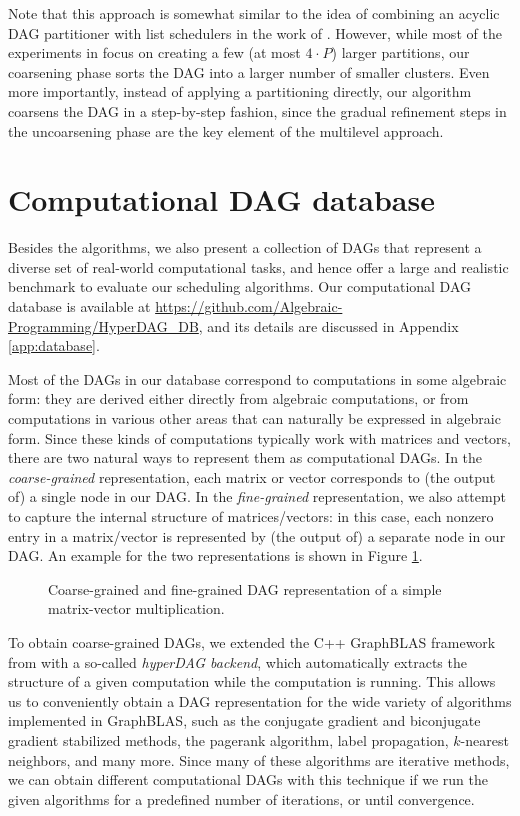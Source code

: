 \documentclass[sigconf,nonacm]{acmart}
\begin{document}
Note that this approach is somewhat similar to the idea of combining an acyclic DAG partitioner with list schedulers in the work of \cite{SPD}. However, while most of the experiments in \cite{SPD} focus on creating a few (at most $4 _{\!} \cdot _{\!} P$) larger partitions, our coarsening phase sorts the DAG into a larger number of smaller clusters. Even more importantly, instead of applying a partitioning directly, our algorithm coarsens the DAG in a step-by-step fashion, since the gradual refinement steps in the uncoarsening phase are the key element of the multilevel approach.

\section{Computational DAG database}

Besides the algorithms, we also present a collection of DAGs that represent a diverse set of real-world computational tasks, and hence offer a large and realistic benchmark to evaluate our scheduling algorithms. Our computational DAG database is available at \url{https://github.com/Algebraic-Programming/HyperDAG_DB}, and its details are discussed in Appendix \ref{app:database}.

Most of the DAGs in our database correspond to computations in some algebraic form: they are derived either directly from algebraic computations, or from computations in various other areas that can naturally be expressed in algebraic form. Since these kinds of computations typically work with matrices and vectors, there are two natural ways to represent them as computational DAGs. In the \emph{coarse-grained} representation, each matrix or vector corresponds to (the output of) a single node in our DAG. In the \emph{fine-grained} representation, we also attempt to capture the internal structure of matrices/vectors: in this case, each nonzero entry in a matrix/vector is represented by (the output of) a separate node in our DAG. An example for the two representations is shown in Figure \ref{fig:coarse_fine}.

\begin{figure}
    \centering
    
    \caption{Coarse-grained and fine-grained DAG representation of a simple matrix-vector multiplication.}
    \label{fig:coarse_fine}
\end{figure}

To obtain coarse-grained DAGs, we extended the C++ GraphBLAS framework from \cite{alp1} with a so-called \textit{hyperDAG backend}, which automatically extracts the structure of a given computation while the computation is running. This allows us to conveniently obtain a DAG representation for the wide variety of algorithms implemented in GraphBLAS, such as the conjugate gradient and biconjugate gradient stabilized methods, the pagerank algorithm, label propagation, $k$-nearest neighbors, and many more. Since many of these algorithms are iterative methods, we can obtain different computational DAGs with this technique if we run the given algorithms for a predefined number of iterations, or until convergence.
\end{document}
